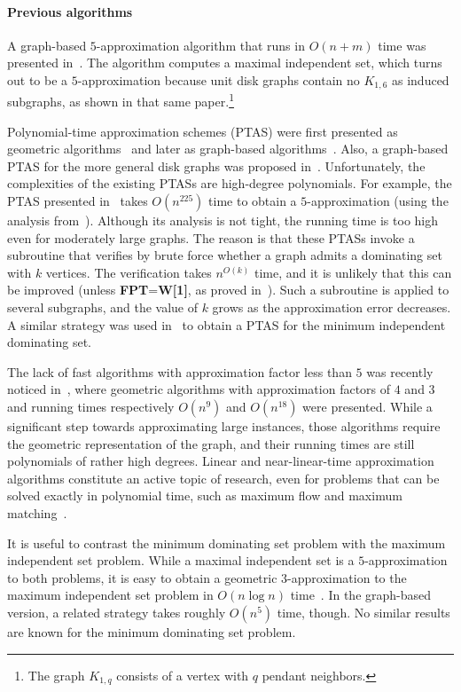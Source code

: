 \documentclass[preprint,12pt]{elsarticle}
\begin{document}
\paragraph*{Previous algorithms}
A graph-based $5$-approximation algorithm that runs in $O(n+m)$ time was presented in~\cite{heuristics}. The algorithm computes a maximal independent set, which turns out to be a $5$-approximation because unit disk graphs contain no $K_{1,6}$ as induced subgraphs, as shown in that same paper.\footnote{The graph $K_{1,q}$ consists of a vertex with $q$ pendant neighbors.}

Polynomial-time approximation schemes (PTAS) were first presented as geometric algorithms~\cite{ptas-geometric} and later as graph-based algorithms~\cite{ptas-graph-journal}. Also, a graph-based PTAS for the more general disk graphs was proposed in~\cite{esa-Gibson}. Unfortunately, the complexities of the existing PTASs are high-degree polynomials. For example, the PTAS presented in~\cite{ptas-graph-journal} takes $O(n^{225})$ time to obtain a $5$-approximation (\mbox{using} the analysis from~\cite{cccg}). Although its analysis is not tight, the running time is too high even for moderately large graphs. The reason is that these PTASs invoke a subroutine that verifies by brute force whether a graph admits a dominating set with $k$ vertices. The verification takes $n^{O(k)}$ time, and it is unlikely that this can be improved (unless \textbf{FPT}=\textbf{W[1]}, as proved in~\cite{marx}). Such a subroutine is applied to several subgraphs, and the value of $k$ grows as the approximation error decreases. A similar strategy was used in~\cite{ids-ptas} to obtain a PTAS for the minimum independent dominating set.

The lack of fast algorithms with approximation factor less than $5$ was recently noticed in~\cite{cccg}, where geometric algorithms with approximation factors of $4$ and $3$ and running times respectively $O(n^{9})$ and $O(n^{18})$ were presented. While a significant step towards approximating large instances, those algorithms require the geometric representation of the graph, and their running times are still polynomials of rather high degrees. Linear and near-linear-time approximation algorithms constitute an active topic of research, even for problems that can be solved exactly in polynomial time, such as maximum flow and maximum matching~\cite{maxflow,matchings}.

It is useful to contrast the minimum dominating set problem with the maximum independent set problem. While a maximal independent set is a $5$-ap\-prox\-i\-ma\-tion to both problems, it is easy to obtain a geometric $3$-ap\-prox\-i\-ma\-tion to the maximum independent set problem in $O(n \log n)$ time~\cite{nieberg}. In the graph-based version, a related strategy takes roughly $O(n^5)$ time, though. No similar results are known for the minimum dominating set problem.
\end{document}
